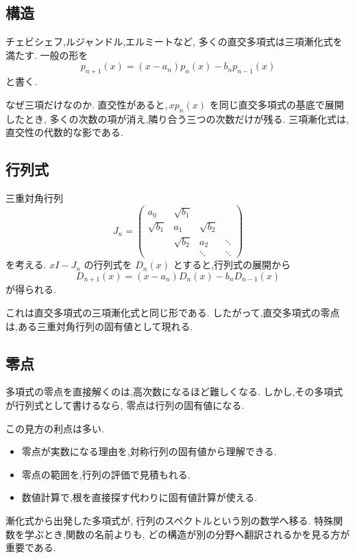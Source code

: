 \subsection{構造}

チェビシェフ,ルジャンドル,エルミートなど,
多くの直交多項式は三項漸化式を満たす.
一般の形を
\[
  p_{n+1}(x)
  =(x-a_n)p_n(x)-b_np_{n-1}(x)
\]
と書く.

なぜ三項だけなのか.
直交性があると,\,$xp_n(x)$ を同じ直交多項式の基底で展開したとき,
多くの次数の項が消え,隣り合う三つの次数だけが残る.
三項漸化式は,直交性の代数的な影である.

\subsection{行列式}

三重対角行列
\[
  J_n=
  \begin{pmatrix}
    a_0&\sqrt{b_1}&&\\
    \sqrt{b_1}&a_1&\sqrt{b_2}&\\
    &\sqrt{b_2}&a_2&\ddots\\
    &&\ddots&\ddots
  \end{pmatrix}
\]
を考える.
$xI-J_n$ の行列式を $D_n(x)$ とすると,行列式の展開から
\[
  D_{n+1}(x)
  =(x-a_n)D_n(x)-b_nD_{n-1}(x)
\]
が得られる.

これは直交多項式の三項漸化式と同じ形である.
したがって,直交多項式の零点は,ある三重対角行列の固有値として現れる.

\subsection{零点}

多項式の零点を直接解くのは,高次数になるほど難しくなる.
しかし,その多項式が行列式として書けるなら,
零点は行列の固有値になる.

この見方の利点は多い.

\begin{itemize}
  \item 零点が実数になる理由を,対称行列の固有値から理解できる.
  \item 零点の範囲を,行列の評価で見積もれる.
  \item 数値計算で,根を直接探す代わりに固有値計算が使える.
\end{itemize}

漸化式から出発した多項式が,
行列のスペクトルという別の数学へ移る.
特殊関数を学ぶとき,関数の名前よりも,
どの構造が別の分野へ翻訳されるかを見る方が重要である.

